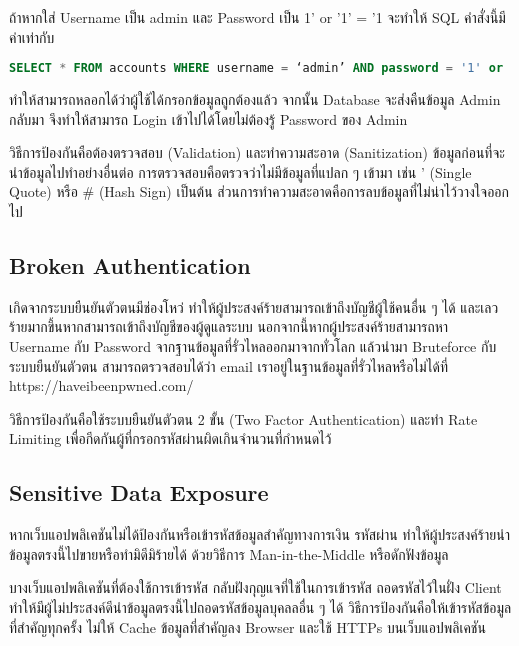 ถ้าหากใส่ Username เป็น admin และ Password เป็น 1' or '1' = '1 จะทำให้ SQL คำสั่งนี้มีค่าเท่ากับ

\begin{lstlisting}[language=SQL, numbers=none] 
SELECT * FROM accounts WHERE username = ‘admin’ AND password = '1' or '1' = '1'
\end{lstlisting}

ทำให้สามารถหลอกได้ว่าผู้ใช้ได้กรอกข้อมูลถูกต้องแล้ว จากนั้น Database จะส่งคืนข้อมูล Admin กลับมา จึงทำให้สามารถ Login เข้าไปได้โดยไม่ต้องรู้ Password ของ Admin

วิธีการป้องกันคือต้องตรวจสอบ (Validation) และทำความสะอาด (Sanitization) ข้อมูลก่อนที่จะนำข้อมูลไปทำอย่างอื่นต่อ การตรวจสอบคือตรวจว่าไม่มีข้อมูลที่แปลก ๆ เข้ามา เช่น ' (Single Quote) หรือ \# (Hash Sign) เป็นต้น ส่วนการทำความสะอาดคือการลบข้อมูลที่ไม่น่าไว้วางใจออกไป

\subsection{Broken Authentication}
เกิดจากระบบยืนยันตัวตนมีช่องโหว่ ทำให้ผู้ประสงค์ร้ายสามารถเข้าถึงบัญชีผู้ใช้คนอื่น ๆ ได้ และเลวร้ายมากขึ้นหากสามารถเข้าถึงบัญชีของผู้ดูแลระบบ นอกจากนี้หากผู้ประสงค์ร้ายสามารถหา Username กับ Password จากฐานข้อมูลที่รั่วไหลออกมาจากทั่วโลก \cite{???} แล้วนำมา Bruteforce กับระบบยืนยันตัวตน สามารถตรวจสอบได้ว่า email เราอยู่ในฐานข้อมูลที่รั่วไหลหรือไม่ได้ที่ https://haveibeenpwned.com/

วิธีการป้องกันคือใช้ระบบยืนยันตัวตน 2 ขั้น (Two Factor Authentication) \cite{???} และทำ Rate Limiting เพื่อกีดกันผู้ที่กรอกรหัสผ่านผิดเกินจำนวนที่กำหนดไว้

\subsection{Sensitive Data Exposure}
หากเว็บแอปพลิเคชันไม่ได้ป้องกันหรือเข้ารหัสข้อมูลสำคัญทางการเงิน รหัสผ่าน ทำให้ผู้ประสงค์ร้ายนำข้อมูลตรงนี้ไปขายหรือทำมิดีมิร้ายได้ ด้วยวิธีการ Man-in-the-Middle \cite{???} หรือดักฟังข้อมูล

บางเว็บแอปพลิเคชันที่ต้องใช้การเข้ารหัส กลับฝังกุญแจที่ใช้ในการเข้ารหัส ถอดรหัสไว้ในฝั่ง Client ทำให้มีผู้ไม่ประสงค์ดีนำข้อมูลตรงนี้ไปถอดรหัสข้อมูลบุคลลอื่น ๆ ได้
วิธีการป้องกันคือให้เข้ารหัสข้อมูลที่สำคัญทุกครั้ง ไม่ให้ Cache ข้อมูลที่สำคัญลง Browser และใช้ HTTPs บนเว็บแอปพลิเคชัน

